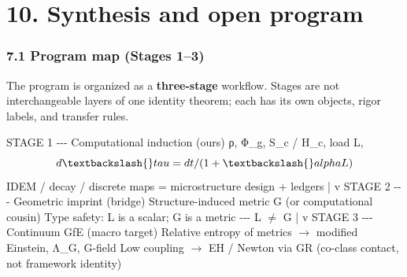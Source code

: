 \documentclass[
  11pt,
]{article}
\newenvironment{Shaded}{}{}
\newcommand{\NormalTok}[1]{#1}
\begin{document}
\section{10. Synthesis and open
program}\label{synthesis-and-open-program}

\subsubsection{7.1 Program map (Stages
1--3)}\label{program-map-stages-13}

The program is organized as a \textbf{three-stage} workflow. Stages are
not interchangeable layers of one identity theorem; each has its own
objects, rigor labels, and transfer rules.

\begin{Shaded}
\begin{Highlighting}[]
\NormalTok{STAGE 1 {-}{-}{-} Computational induction (ours)}
\NormalTok{  ρ, Φ\_g, S\_c / H\_c, load L, $$d\textbackslash{}tau=dt/(1+\textbackslash{}alpha L)$$}
\NormalTok{  IDEM / decay / discrete maps = microstructure design + ledgers}
\NormalTok{        |}
\NormalTok{        v}
\NormalTok{STAGE 2 {-}{-}{-} Geometric imprint (bridge)}
\NormalTok{  Structure{-}induced metric G  (or computational cousin)}
\NormalTok{  Type safety: L is a scalar; G is a metric {-}{-}{-} L $\neq$ G}
\NormalTok{        |}
\NormalTok{        v}
\NormalTok{STAGE 3 {-}{-}{-} Continuum GfE (macro target)}
\NormalTok{  Relative entropy of metrics $\to$ modified Einstein, Λ\_G, G{-}field}
\NormalTok{  Low coupling $\to$ EH / Newton via GR (co{-}class contact, not framework identity)}
\end{Highlighting}
\end{Shaded}
\end{document}
